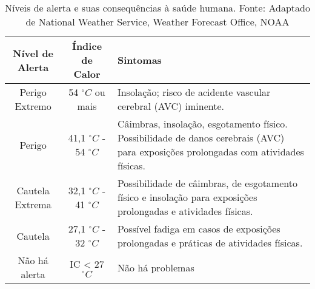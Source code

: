 \begin{table}[h!]
  \caption{Níveis de alerta e suas consequências à saúde humana. Fonte: Adaptado de National Weather Service, Weather Forecast Office, NOAA} \label{tab:indiceCalor}
  \centering
\begin{tabular}{ccp{7cm}}
 \toprule
 \textbf{Nível de Alerta} & \textbf{Índice de Calor} & \textbf{Sintomas}\\
 \midrule
Perigo Extremo & 54 $^{\circ}C$ ou mais & Insolação; risco de acidente vascular cerebral (AVC) iminente.\\
Perigo & 41,1 $^{\circ}C$ - 54 $^{\circ}C$  & Câimbras, insolação, esgotamento físico. Possibilidade de danos cerebrais (AVC) para exposições prolongadas com atividades físicas.\\
Cautela Extrema & 32,1 $^{\circ}C$ - 41 $^{\circ}C$ & Possibilidade de câimbras, de esgotamento físico e insolação para exposições prolongadas e atividades físicas.\\
Cautela & 27,1 $^{\circ}C$ - 32 $^{\circ}C$ & Possível fadiga em casos de exposições prolongadas e práticas de atividades físicas.\\
Não há alerta & IC < 27 $^{\circ}C$ & Não há problemas\\
\bottomrule
\end{tabular}
\end{table}

